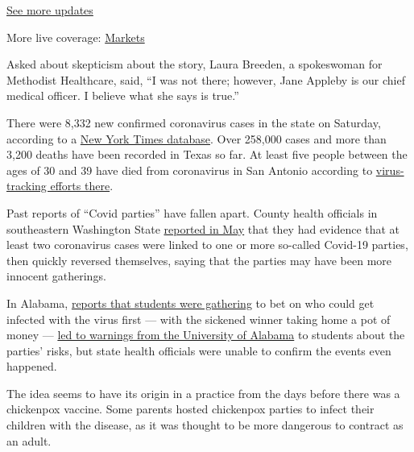 \href{https://www.nytimes3xbfgragh.onion/2020/09/11/world/covid-19-coronavirus.html?action=click\&pgtype=Article\&state=default\&region=MAIN_CONTENT_1\&context=storylines_live_updates}{See
more updates}

More live coverage:
\href{https://www.nytimes3xbfgragh.onion/live/2020/09/11/business/stock-market-today-coronavirus?action=click\&pgtype=Article\&state=default\&region=MAIN_CONTENT_1\&context=storylines_live_updates}{Markets}

Asked about skepticism about the story, Laura Breeden, a spokeswoman for
Methodist Healthcare, said, ``I was not there; however, Jane Appleby is
our chief medical officer. I believe what she says is true.''

There were 8,332 new confirmed coronavirus cases in the state on
Saturday, according to a
\href{https://www.nytimes3xbfgragh.onion/interactive/2020/us/texas-coronavirus-cases.html}{New
York Times database}. Over 258,000 cases and more than 3,200 deaths have
been recorded in Texas so far. At least five people between the ages of
30 and 39 have died from coronavirus in San Antonio according to
\href{https://covid19.sanantonio.gov/About-COVID-19/Case-Numbers-Table-Data}{virus-tracking
efforts there}.

Past reports of ``Covid parties'' have fallen apart. County health
officials in southeastern Washington State
\href{https://www.nytimes3xbfgragh.onion/2020/05/06/us/coronavirus-covid-parties.html}{reported
in May} that they had evidence that at least two coronavirus cases were
linked to one or more so-called Covid-19 parties, then quickly reversed
themselves, saying that the parties may have been more innocent
gatherings.

In Alabama,
\href{https://www.wbrc.com/2020/07/03/covid-parties-tuscaloosa-whats-really-going/}{reports
that students were gathering} to bet on who could get infected with the
virus first --- with the sickened winner taking home a pot of money ---
\href{https://abc3340.com/news/local/university-of-alabama-responds-to-covid-parties-being-thrown-in-tuscaloosa}{led
to warnings from the University of Alabama} to students about the
parties' risks, but state health officials were unable to confirm the
events even happened.

The idea seems to have its origin in a practice from the days before
there was a chickenpox vaccine. Some parents hosted chickenpox parties
to infect their children with the disease, as it was thought to be more
dangerous to contract as an adult.

